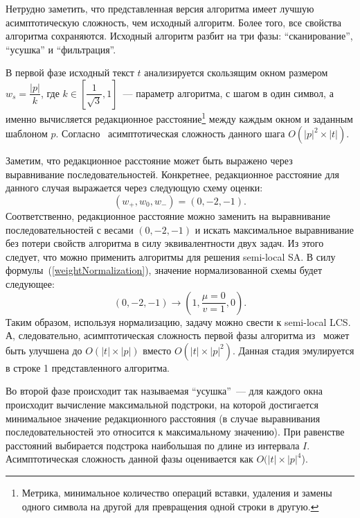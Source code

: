 Нетрудно заметить, что представленная версия алгоритма имеет лучшую асимптотическую сложность, чем исходный алгоритм.
Более того, все свойства алгоритма сохраняются.
Исходный алгоритм разбит на три фазы: ``сканирование'', ``усушка'' и ``фильтрация''.

В первой фазе исходный текст $t$ анализируется скользящим окном размером $w_{s} = \dfrac{|p|}{k}$, где $k \in [\dfrac{1}{\sqrt{3}},1]$~--- параметр алгоритма, с шагом в один символ, а именно вычисляется редакционное расстояние\footnote{Метрика, минимальное количество операций вставки, удаления и замены одного символа на другой для превращения одной строки в другую.} между каждым окном и заданным шаблоном $p$.
Согласно~\cite{luciv2019interactive} асимптотическая сложность данного шага $O(|p|^2 \times |t|)$.

Заметим, что редакционное расстояние может быть выражено через выравнивание последовательностей.
Конкретнее, редакционное расстояние для данного случая выражается через следующую схему оценки:
\begin{equation}\label{weightAppr}
    (w_{+},w_{0},w_{-}) = (0,-2,-1).
\end{equation}
Соответственно, редакционное расстояние можно заменить на выравнивание последовательностей с весами $(0,-2,-1)$ и искать максимальное выравнивание без потери свойств алгоритма в силу эквивалентности двух задач.
Из этого следует, что можно применить алгоритмы для решения {semi-local SA}.
В силу формулы~(\ref{weightNormalization}), значение нормализованной схемы будет следующее:
\begin{equation}
    (0, -2, -1) \rightarrow (1,\frac{\mu=0}{v=1}, 0).
\end{equation}
Таким образом, используя нормализацию, задачу можно свести к {semi-local LCS}.
А, следовательно, асимптотическая сложность первой фазы алгоритма из~\cite{luciv2019interactive} может быть улучшена до $O(|t| \times |p|)$ вместо $O(|t| \times |p|^2)$.
Данная стадия эмулируется в строке 1 представленного алгоритма.

Во второй фазе происходит так называемая ``усушка''~--- для каждого окна происходит вычисление максимальной подстроки, на которой достигается минимальное значение редакционного расстояния (в случае выравнивания последовательностей это относится к максимальному значению).
При равенстве расстояний выбирается подстрока наибольшая по длине из интервала $I$.
Асимптотическая сложность данной фазы оценивается как $O(|t| \times |p|^4$).

